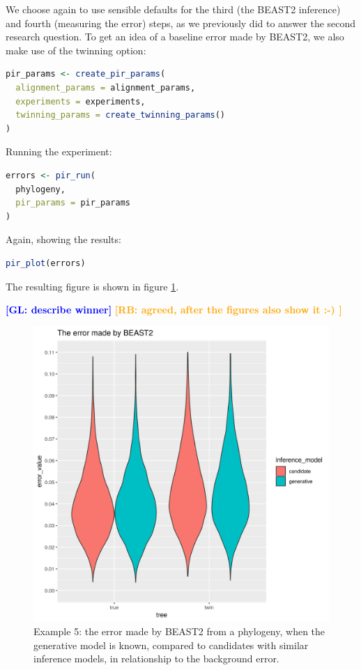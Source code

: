 \documentclass{article}
\newcommand{\giovanni}[1]{\textcolor{blue}{\textbf{[GL: #1]}}}
\newcommand{\richel}[1]{\textcolor{orange}{\textbf{[RB: #1]}}}
\begin{document}
We choose again to use sensible defaults for the third (the BEAST2 inference) and fourth (measuring the error) steps, as we previously did to answer the second research question. To get an idea of a baseline error made by BEAST2, we also make use of the twinning option:

\begin{lstlisting}[language=R, floatplacement=H, frame=single]
pir_params <- create_pir_params(
  alignment_params = alignment_params,
  experiments = experiments,
  twinning_params = create_twinning_params()
)
\end{lstlisting}

Running the experiment:

\begin{lstlisting}[language=R, floatplacement=H, frame=single]
errors <- pir_run(
  phylogeny,
  pir_params = pir_params
)
\end{lstlisting}

Again, showing the results:

\begin{lstlisting}[language=R, floatplacement=H, frame=single]
pir_plot(errors)
\end{lstlisting}

The resulting figure is shown in figure \ref{fig:example_5}.

\giovanni{describe winner}
\richel{agreed, after the figures also show it :-) }

\begin{figure}[h]
  \includegraphics[width=\textwidth]{example_5_errors.png}
  \caption{
    Example 5: the error made by BEAST2 from a phylogeny, 
    when the generative model is known, 
    compared to candidates with similar inference models, 
    in relationship to the background error.
  }
  \label{fig:example_5}
\end{figure}
\end{document}
